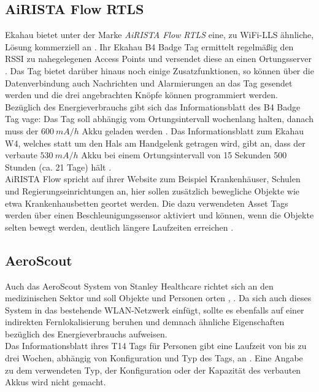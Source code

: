 \subsection{AiRISTA Flow RTLS}
Ekahau bietet unter der Marke \textit{AiRISTA Flow RTLS} eine, zu WiFi-LLS ähnliche, Lösung kommerziell an \cite{airista2017airista}.
Ihr Ekahau B4 Badge Tag ermittelt regelmäßig den RSSI zu nahegelegenen Access Points und versendet diese an einen Ortungsserver \cite{liu2007survey}.
Das Tag bietet darüber hinaus noch einige Zusatzfunktionen, so können über die Datenverbindung auch Nachrichten und Alarmierungen an das Tag gesendet werden und die drei angebrachten Knöpfe können programmiert werden.\\
Bezüglich des Energieverbrauchs gibt sich das Informationsblatt des B4 Badge Tag vage: Das Tag soll abhängig vom Ortungsintervall wochenlang halten, danach muss der $600\ mA/h$ Akku geladen werden \cite{ekahau2017b4}.
Das Informationsblatt zum Ekahau W4, welches statt um den Hals am Handgelenk getragen wird, gibt an, dass der verbaute $530\ mA/h$ Akku bei einem Ortungsintervall von 15 Sekunden 500 Stunden (ca. 21 Tage) hält \cite{ekahau2017w4}.\\
AiRISTA Flow spricht auf ihrer Website zum Beispiel Krankenhäuser, Schulen und Regierungseinrichtungen an, hier sollen zusätzlich bewegliche Objekte wie etwa Krankenhausbetten geortet werden.
Die dazu verwendeten Asset Tags werden über einen Beschleunigungssensor aktiviert und können, wenn die Objekte selten bewegt werden, deutlich längere Laufzeiten erreichen \cite{ekahau2017a4}. \\

\subsection{AeroScout}
Auch das AeroScout System von Stanley Healthcare richtet sich an den medizinischen Sektor und soll Objekte und Personen orten \cite{aeroscout2017asset}, \cite{aeroscout2017staff}.
Da sich auch dieses System in das bestehende WLAN-Netzwerk einfügt, sollte es ebenfalls auf einer indirekten Fernlokalisierung beruhen und demnach ähnliche Eigenschaften bezüglich des Energieverbrauchs aufweisen.\\
Das Informationsblatt ihres T14 Tags für Personen gibt eine Laufzeit von bis zu drei Wochen, abhängig von Konfiguration und Typ des Tags, an \cite{aeroscout2017t14}. 
Eine Angabe zu dem verwendeten Typ, der Konfiguration oder der Kapazität des verbauten Akkus wird nicht gemacht.\\

